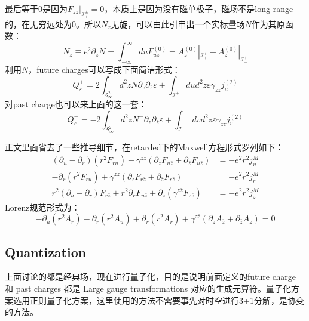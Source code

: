 最后等于0是因为$F_{z\bar z}|_{\mathcal{I}_{+}^{\pm}}=0$，本质上是因为没有磁单极子，磁场不是long-range的，在无穷远处为0。所以$N_z$无旋，可以由此引申出一个实标量场$N$作为其原函数：
\begin{equation}
	N_z\equiv e^2\partial_zN=\int_{-\infty}^{\infty}duF_{uz}^{(0)}=A_{z}^{(0)}|_{\mathcal{I}_{+}^{+}}-A_{z}^{(0)}|_{\mathcal{I}_{-}^{+}}
\end{equation}
利用$N$，future charges可以写成下面简洁形式：
\begin{equation}\label{eq:23.21}
	Q_{\varepsilon}^{+}=2\int_{\mathcal{S}_\infty^2} d^{2}zN\partial_{z}\partial_{\bar{z}}\varepsilon+\int_{\mathcal I^{+}}dud^{2}z\varepsilon\gamma_{z\bar{z}}j_{u}^{(2)}
\end{equation}
对past charge也可以来上面的这一套：
\begin{equation}\label{eq:23.21.2}
	Q_{\varepsilon}^{-}=-2\int_{\mathcal{S}_\infty^2} d^{2}zN^-\partial_{z}\partial_{\bar{z}}\varepsilon+\int_{\mathcal I^{-}}dvd^{2}z\varepsilon\gamma_{z\bar{z}}j_{v}^{(2)}
\end{equation}
\begin{remark}
	正文里面省去了一些推导细节，在retarded下的Maxwell方程形式罗列如下：
	\begin{equation}
		\begin{aligned}(\partial_u-\partial_r)\left(r^2F_{ru}\right)+\gamma^{z\bar{z}}\left(\partial_zF_{u\bar{z}}+\partial_{\bar{z}}F_{u\bar{z}}\right)&=-e^2r^2j^M_u\\-\partial_r\left(r^2F_{ru}\right)+\gamma^{z\bar{z}}\left(\partial_zF_{r\bar{z}}+\partial_{\bar{z}}F_{r\bar{z}}\right)&=-e^2r^2j^M_r\\r^2\left(\partial_u-\partial_r\right)F_{r\bar{z}}+r^2\partial_rF_{u\bar{z}}+\partial_z\left(\gamma^{z\bar{z}}F_{z\bar{z}}\right)&=-e^2r^2j^M_z\end{aligned}
	\end{equation}
	Lorenz规范形式为：
	\begin{equation}
		-\partial_u\left(r^2A_r\right)-\partial_r\left(r^2A_u\right)+\partial_r\left(r^2A_r\right)+\gamma^{z\bar{z}}\left(\partial_zA_{\bar{z}}+\partial_{\bar{z}}A_z\right)=0
	\end{equation}
\end{remark}
\subsection{Quantization}
上面讨论的都是经典场，现在进行量子化，目的是说明前面定义的future charge 和 past charges 都是 Large gauge transformations 对应的生成元算符。量子化方案选用正则量子化方案，这里使用的方法不需要事先对时空进行3+1分解，是协变的方法\cite{Ashtekar1987AsymptoticQ,Frolov:1979ab,1989thyg.book.....H,Lee:1990nz,Wald:1999wa}。

